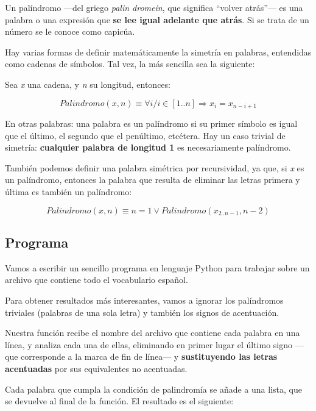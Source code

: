 \documentclass[10pt,a4paper]{article}
\begin{document}
	Un palíndromo ---del griego \textit{palin dromein}, que significa ``volver atrás''--- es una palabra o una expresión que \textbf{se lee igual adelante que atrás}. Si se trata de un número se le conoce como capicúa. \cite{palindromo}
	
	Hay varias formas de definir matemáticamente la simetría en palabras, entendidas como cadenas de símbolos. Tal vez, la más sencilla sea la siguiente:
	
	Sea \textit{x} una cadena, y \textit{n} su longitud, entonces:
	
	\begin{equation}
	Palindromo(x,n) \equiv \forall i / i \in [1..n] \Longrightarrow x_i = x_{n-i+1}
	\end{equation}
	
	En otras palabras: una palabra es un palíndromo si su primer símbolo es igual que el último, el segundo que el penúltimo, etcétera. Hay un caso trivial de simetría: \textbf{cualquier palabra de longitud 1} es necesariamente palíndromo.
	
	También podemos definir una palabra simétrica por recursividad, ya que, si \textit{x} es un palíndromo, entonces la palabra que resulta de eliminar las letras primera y última es también un palíndromo:
	
	\begin{equation}
	Palindromo(x,n) \equiv n = 1 \lor Palindromo(x_{2..n-1}, n - 2)
	\end{equation}
	
	\subsection{Programa}
	
	Vamos a escribir un sencillo programa en lenguaje Python para trabajar sobre un archivo que contiene todo el vocabulario español. \cite{teoruiz}
	
	Para obtener resultados más interesantes, vamos a ignorar los palíndromos triviales (palabras de una sola letra) y también los signos de acentuación.
	
	Nuestra función recibe el nombre del archivo que contiene cada palabra en una línea, y analiza cada una de ellas, eliminando en primer lugar el último signo ---que corresponde a la marca de fin de línea--- y \textbf{sustituyendo las letras acentuadas} por sus equivalentes no acentuadas.
	
	Cada palabra que cumpla la condición de palindromía se añade a una lista, que se devuelve al final de la función. El resultado es el siguiente:
	
\end{document}
